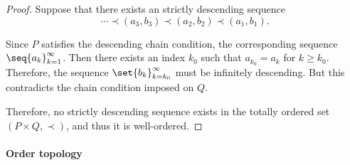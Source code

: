 \begin{proof}
  Suppose that there exists an strictly descending sequence
  \begin{equation*}
    \cdots \prec (a_3, b_3) \prec (a_2, b_2) \prec (a_1, b_1).
  \end{equation*}

  Since \( P \) satisfies the descending chain condition, the corresponding sequence \( \seq{ a_k }_{k=1}^\infty \). Then there exists an index \( k_0 \) such that \( a_{k_0} = a_k \) for \( k \geq k_0 \). Therefore, the sequence \( \set{ b_k }_{k=k_0}^\infty \) must be infinitely descending. But this contradicts the chain condition imposed on \( Q \).

  Therefore, no strictly descending sequence exists in the totally ordered set \( (P \times Q, \prec) \), and thus it is well-ordered.
\end{proof}

\paragraph{Order topology}

